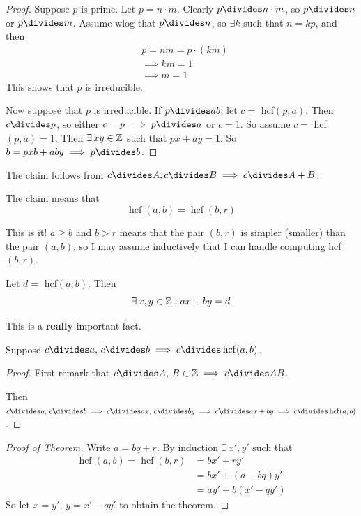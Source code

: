 \documentclass[10pt]{scrartcl}
\DeclareMathOperator{\hcf}{hcf}
\begin{document}
\begin{proof}
Suppose $p$ is prime. Let $ p = n \cdot m$. Clearly $p \divides n\cdot m$, so $p \divides n$ or $p \divides m$. Assume wlog that $p \divides n$, so $\exists k$ such that $n = kp$, and then 
\[
\begin{aligned}
 & p = nm = p\cdot(km)\\
  &\implies km =1\\
  &\implies m =1
\end{aligned}
\]
This shows that $p$ is irreducible. 

Now suppose that $p$ is irreducible. If $p \divides ab$, let $c = $ hcf$(p,a)$. Then $c \divides p$, so either $c = p \implies p \divides a$ or $c = 1$. So assume $c = $ hcf$(p,a) = 1$. Then $\exists\, xy \in \mathbb{Z}$ such that $px + ay = 1$. So $b = pxb + aby \implies p \divides b$. 
\end{proof}

\begin{remark}
The claim follows from $c \divides A, c \divides B \implies c \divides A + B$.	
\end{remark}

The claim means that 
\[\boxed{\hcf(a,b) = \hcf(b,r)}\]

This is it! $a \geq b$ and $b > r$ means that the pair $(b,r)$ is simpler (smaller) than the pair $(a,b)$, so I may assume inductively that I can handle computing hcf$(b,r)$. \pagebreak

\begin{theorem}
Let $d =$ hcf$(a,b)$. Then
\[\exists\,x,y \in\mathbb{Z}: ax + by = d\]	
\end{theorem}\vsp

This is a \textbf{really} important fact.\vsp

\begin{corollary}
Suppose $c \divides a,\, c\divides b \implies c\divides \hcf(a,b)$.	
\end{corollary}

\begin{proof}
First remark that 
$c \divides A,\, B \iZ \implies c \divides AB$.

Then $c \divides a,\, c \divides b \implies c \divides ax,\, c\divides by \implies c \divides ax + by \implies c \divides \hcf(a,b)$. 
\end{proof}

\begin{proof}[Proof of Theorem]
Write $a = bq + r$. By induction $\exists\, x', y'$ such that 
\[
\begin{aligned}
  \hcf(a,b) = \hcf(b,r) &= bx' + ry'\\
  &= bx' + (a-bq)y'\\
  &= ay' + b(x' - qy')
\end{aligned}
\]
So let $x = y',\, y = x' - qy'$ to obtain the theorem.
\end{proof}\vspace*{5pt}
\end{document}
